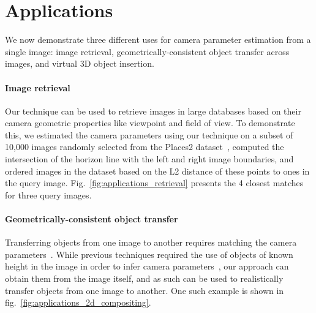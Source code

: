 \section{Applications}

We now demonstrate three different uses for camera parameter estimation from a single image: image retrieval, geometrically-consistent object transfer across images, and virtual 3D object insertion.

\paragraph{Image retrieval}

Our technique can be used to retrieve images in large databases based on their camera geometric properties like viewpoint and field of view. To demonstrate this, we estimated the camera parameters using our technique on a subset of 10,000 images randomly selected from the Places2 dataset~\cite{Zhou2017}, computed the intersection of the horizon line with the left and right image boundaries, and ordered images in the dataset based on the L2 distance of these points to ones in the query image. Fig.~\ref{fig:applications_retrieval} presents the 4 closest matches for three query images.

\paragraph{Geometrically-consistent object transfer}

Transferring objects from one image to another requires matching the camera parameters~\cite{lalonde-siggraph-07}. While previous techniques required the use of objects of known height in the image in order to infer camera parameters~\cite{lalonde-siggraph-07}, our approach can obtain them from the image itself, and as such can be used to realistically transfer objects from one image to another. One such example is shown in fig.~\ref{fig:applications_2d_compositing}. 

